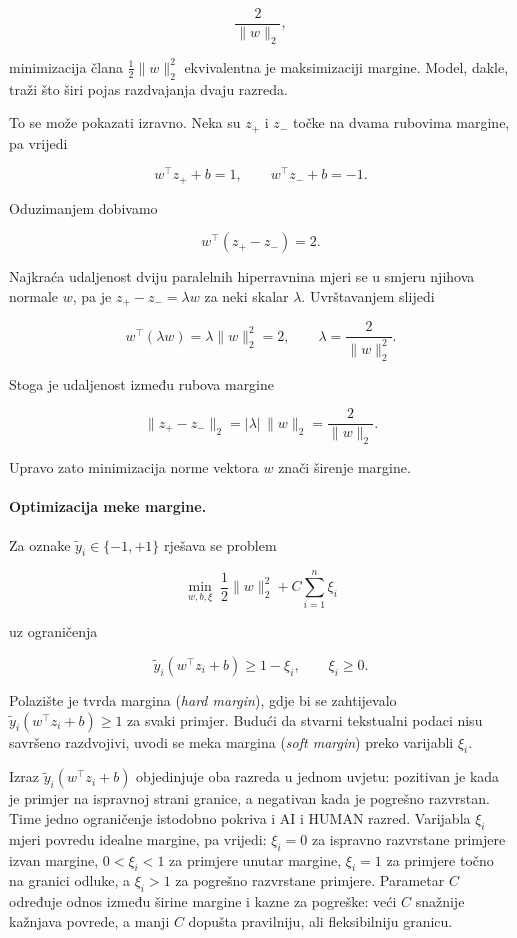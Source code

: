 \documentclass{article}
\begin{document}
\[
\frac{2}{\|w\|_2},
\]

minimizacija člana $\frac{1}{2}\|w\|_2^2$ ekvivalentna je maksimizaciji margine. Model, dakle, traži što širi pojas razdvajanja dvaju razreda.

To se može pokazati izravno. Neka su $z_+$ i $z_-$ točke na dvama rubovima margine, pa vrijedi

\[
w^\top z_+ + b = 1,
\qquad
w^\top z_- + b = -1.
\]

Oduzimanjem dobivamo

\[
w^\top (z_+ - z_-) = 2.
\]

Najkraća udaljenost dviju paralelnih hiperravnina mjeri se u smjeru njihova normale $w$, pa je $z_+ - z_- = \lambda w$ za neki skalar $\lambda$. Uvrštavanjem slijedi

\[
w^\top(\lambda w)=\lambda\|w\|_2^2=2,
\qquad
\lambda=\frac{2}{\|w\|_2^2}.
\]

Stoga je udaljenost između rubova margine

\[
\|z_+-z_-\|_2 = |\lambda|\,\|w\|_2 = \frac{2}{\|w\|_2}.
\]

Upravo zato minimizacija norme vektora $w$ znači širenje margine.

\paragraph{Optimizacija meke margine.}
Za oznake $\tilde y_i\in\{-1,+1\}$ rješava se problem

\[
\min_{w,b,\xi}\;\frac{1}{2}\|w\|_2^2 + C\sum_{i=1}^n \xi_i
\]

uz ograničenja

\[
\tilde y_i(w^\top z_i+b)\ge 1-\xi_i,
\qquad
\xi_i\ge 0.
\]

Polazište je tvrda margina (\textit{hard margin}), gdje bi se zahtijevalo $\tilde y_i(w^\top z_i+b)\ge 1$ za svaki primjer. Budući da stvarni tekstualni podaci nisu savršeno razdvojivi, uvodi se meka margina (\textit{soft margin}) preko varijabli $\xi_i$.

Izraz $\tilde y_i(w^\top z_i+b)$ objedinjuje oba razreda u jednom uvjetu: pozitivan je kada je primjer na ispravnoj strani granice, a negativan kada je pogrešno razvrstan. Time jedno ograničenje istodobno pokriva i AI i HUMAN razred. Varijabla $\xi_i$ mjeri povredu idealne margine, pa vrijedi: $\xi_i=0$ za ispravno razvrstane primjere izvan margine, $0<\xi_i<1$ za primjere unutar margine, $\xi_i=1$ za primjere točno na granici odluke, a $\xi_i>1$ za pogrešno razvrstane primjere. Parametar $C$ određuje odnos između širine margine i kazne za pogreške: veći $C$ snažnije kažnjava povrede, a manji $C$ dopušta pravilniju, ali fleksibilniju granicu.
\end{document}
